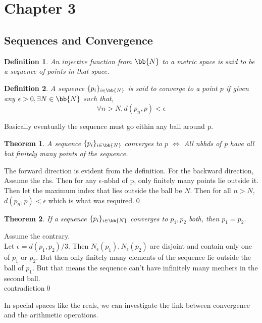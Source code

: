\documentclass{myclass}
\newtheorem*{definition}{Definition}
\newtheorem*{theorem}{Theorem}
\begin{document}
\section*{Chapter 3}

\subsection{Sequences and Convergence}

\begin{definition}
    An injective function from $\bb{N}$ to a metric space is said to be a 
    sequence of points in that space.
\end{definition}

\begin{definition}
    A sequence $\{p_i\}_{i\in\bb{N}}$ is said to converge to a point $p$ if given any
    $\epsilon>0,\exists N\in\bb{N}$ such that,$$\forall n>N, d(p_n,p)<\epsilon$$
\end{definition}

\begin{remark}
    Basically eventually the sequence must go eithin any ball around p.
\end{remark}

\begin{theorem}
    A sequence $\{p_i\}_{i\in\bb{N}}$ converges to $p$ $\iff$ All nbhds of p have all but finitely many points of the sequence.
\end{theorem}
\begin{prf}
    The forward direction is evident from the definition. For the backward direction, Assume the rhs.
    Then for any $\epsilon$-nbhd of p, only finitely many points lie outside it. Then let the maximum index that lies outside the ball be $N$.
    Then for all $n>N$,$d(p_n,p)<\epsilon$ which is what was required.\qed
\end{prf}

\begin{theorem}
    If a sequence $\{p_i\}_{i\in\bb{N}}$ converges to $p_1,p_2$ both, then $p_1=p_2$.
\end{theorem}
\begin{prf}
    Assume the contrary.\\
    Let $\epsilon=d(p_1,p_2)/3$. Then $N_\epsilon(p_1),N_\epsilon(p_2)$ are disjoint and contain only one of $p_1$ or $p_2$.
    But then only finitely many elements of the sequence lie outside the ball of $p_1$. But that means the sequence can't have infinitely many menbers in the second ball.\\
    contradiction\qed
\end{prf}

In special spaces like the reals, we can investigate the link between convergence and the arithmetic operations.
\end{document}
